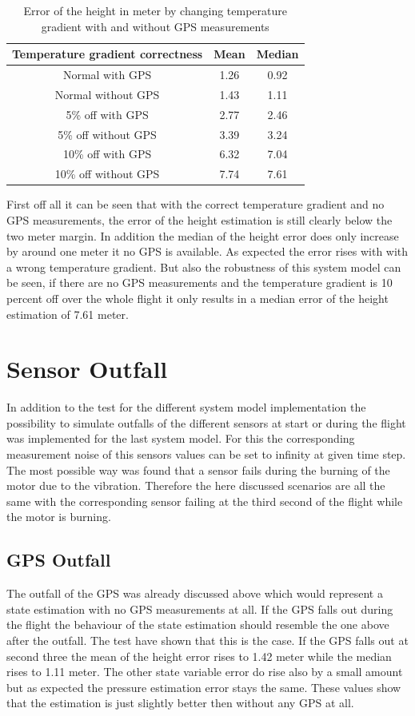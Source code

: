 \begin{table}[h!]
\centering
\begin{tabular}{ccc}
\hline
\multicolumn{1}{|c|}{Temperature gradient correctness} & \multicolumn{1}{|c|}{Mean}& \multicolumn{1}{|c|}{Median} \\ \hline
Normal with GPS 	& 1.26 		& 0.92\\
Normal without GPS	& 1.43	 	& 1.11\\
5\% off with GPS 	& 2.77	 	& 2.46\\
5\% off without GPS 	& 3.39	 	& 3.24\\
10\% off with GPS 	& 6.32	 	& 7.04\\
10\% off without GPS 	& 7.74 		& 7.61
\end{tabular}
\caption{Error of the height in meter by changing temperature gradient with and without GPS measurements}
\label{tab:ErrorChangingTempGradWithWithoutGPS}
\end{table}

First off all it can be seen that with the correct temperature gradient and no GPS measurements,
the error of the height estimation is still clearly below the two meter margin.
In addition the median of the height error does only increase by around one meter it no GPS is available.
As expected the error rises with with a wrong temperature gradient.
But also the robustness of this system model can be seen, if there are no GPS measurements
and the temperature gradient is 10 percent off over the whole flight it only results in a median error of the height estimation of 7.61 meter.

\section{Sensor Outfall}
In addition to the test for the different system model implementation
the possibility to simulate outfalls of the different sensors at start or during the flight was implemented for the last system model.
For this the corresponding measurement noise of this sensors values can be set to infinity at given time step.
The most possible way was found that a sensor fails during the burning of the motor due to the vibration.
Therefore the here discussed scenarios are all the same with the corresponding sensor failing at the third second of the flight while the motor is burning.

\subsection{GPS Outfall}
The outfall of the GPS was already discussed above which would represent a state estimation with no GPS measurements at all.
If the GPS falls out during the flight the behaviour of the state estimation should resemble the one above after the outfall.
The test have shown that this is the case.
If the GPS falls out at second three the mean of the height error rises to 1.42 meter while the median rises to 1.11 meter.
The other state variable error do rise also by a small amount but as expected the pressure estimation error stays the same.
These values show that the estimation is just slightly better then without any GPS at all.

